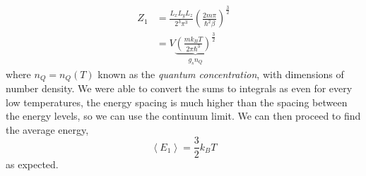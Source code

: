 \documentclass{book}
\begin{document}
\begin{equation}
	\begin{split}
	Z_1 &= \frac{L_xL_yL_z}{2^3\pi^3}\left(\frac{2m\pi}{\hbar^2\beta}\right)^{\frac{3}{2}} \\
	& = V\underbrace{\left(\frac{mk_BT}{2\pi\hbar^3}\right)^{\frac{3}{2}}}_{g_sn_Q}
\end{split}
\end{equation}
where $n_Q = n_Q(T)$ known as the \textit{quantum concentration}, with dimensions of number density. We were able to convert the sums to integrals as even for every low temperatures, the energy spacing is much higher than the spacing between the energy levels, so we can use the continuum limit. We can then proceed to find the average energy,
\begin{equation}
	\left<E_1\right> = \frac{3}{2}k_BT
\end{equation}
as expected.
\end{document}
